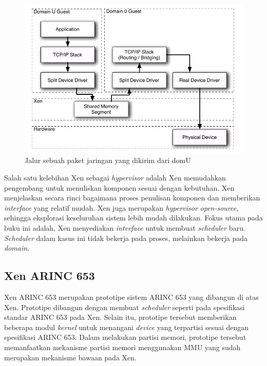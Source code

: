 \begin{figure}[htbp]
    \includegraphics[scale=0.5]{./resources/xen-split-driver.png}
    \caption[Jalur sebuah paket jaringan yang dikirim dari domU]{Jalur sebuah paket jaringan yang dikirim dari domU \citep{Chisnall2014}}
    \label{figure:xen_split_driver}
\end{figure}

Salah satu kelebihan Xen sebagai \textit{hypervisor} adalah Xen memudahkan pengembang untuk menuliskan komponen sesuai dengan kebutuhan.
Xen menjelaskan secara rinci bagaimana proses penulisan komponen dan memberikan \textit{interface} yang relatif mudah.
Xen juga merupakan \textit{hypervisor} \textit{open-source}, sehingga eksplorasi keseluruhan sistem lebih mudah dilakukan.
Fokus utama pada buku ini adalah, Xen menyediakan \textit{interface} untuk membuat \textit{scheduler} baru.
\textit{Scheduler} dalam kasus ini tidak bekerja pada proses, melainkan bekerja pada \textit{domain}.

\subsection{Xen ARINC 653}

Xen ARINC 653 merupakan prototipe sistem ARINC 653 yang dibangun di atas Xen.
Prototipe dibangun dengan membuat \textit{scheduler} seperti pada spesifikasi standar ARINC 653 pada Xen.
Selain itu, prototipe tersebut memberikan beberapa modul \textit{kernel} untuk menangani \textit{device} yang terpartisi sesuai dengan spesifikasi ARINC 653.
Dalam melakukan partisi memori, prototipe tersebut memanfaatkan mekanisme partisi memori menggunakan MMU yang sudah merupakan mekanisme bawaan pada Xen.

